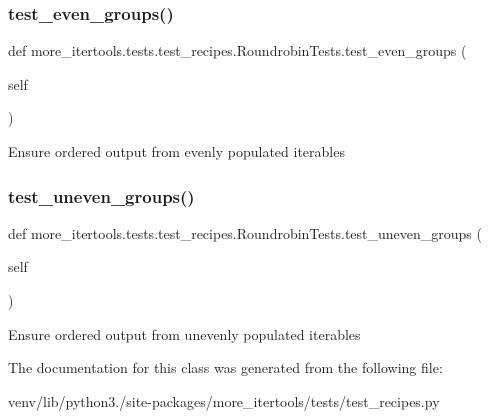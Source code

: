 \subsubsection{\texorpdfstring{test\+\_\+even\+\_\+groups()}{test\_even\_groups()}}
{\footnotesize\ttfamily def more\+\_\+itertools.\+tests.\+test\+\_\+recipes.\+Roundrobin\+Tests.\+test\+\_\+even\+\_\+groups (\begin{DoxyParamCaption}\item[{}]{self }\end{DoxyParamCaption})}

\begin{DoxyVerb}Ensure ordered output from evenly populated iterables\end{DoxyVerb}
 \mbox{\label{classmore__itertools_1_1tests_1_1test__recipes_1_1_roundrobin_tests_a3191268c39a2e798fe9c672538e45c0f}} 
\subsubsection{\texorpdfstring{test\+\_\+uneven\+\_\+groups()}{test\_uneven\_groups()}}
{\footnotesize\ttfamily def more\+\_\+itertools.\+tests.\+test\+\_\+recipes.\+Roundrobin\+Tests.\+test\+\_\+uneven\+\_\+groups (\begin{DoxyParamCaption}\item[{}]{self }\end{DoxyParamCaption})}

\begin{DoxyVerb}Ensure ordered output from unevenly populated iterables\end{DoxyVerb}
 

The documentation for this class was generated from the following file\+:\begin{DoxyCompactItemize}
\item 
venv/lib/python3./site-\/packages/more\+\_\+itertools/tests/test\+\_\+recipes.\+py\end{DoxyCompactItemize}
